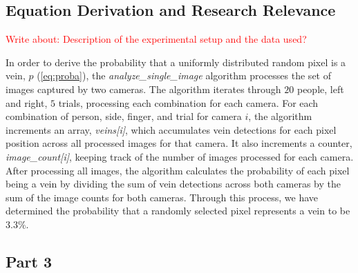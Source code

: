 \subsection{Equation Derivation and Research Relevance}
\textcolor{red}{Write about: Description of the experimental setup and the data used? }

In order to derive the probability that a uniformly distributed random pixel is a vein, $p$ (\ref{eq:proba}), the \textit{analyze\_single\_image} algorithm processes the set of images captured by two cameras. The algorithm iterates through \(20\) people, left and right, \(5\) trials, processing each combination for each camera. For each combination of person, side, finger, and trial for camera \(i\), the algorithm increments an array, \textit{veins[i]}, which accumulates vein detections for each pixel position across all processed images for that camera. It also increments a counter, \textit{image\_count[i]}, keeping track of the number of images processed for each camera. 
After processing all images, the algorithm calculates the probability of each pixel being a vein by dividing the sum of vein detections across both cameras by the sum of the image counts for both cameras. Through this process, we have determined the probability that a randomly selected pixel represents a vein to be \(3.3\%\).


\subsection{Part 3}